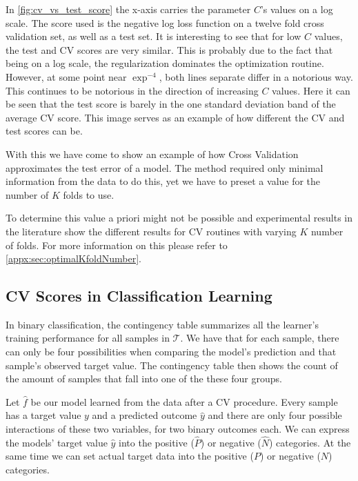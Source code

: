 In \cref{fig:cv_vs_test_score} the x-axis carries the parameter $C$'s values on a log scale.
The score used is the negative log loss function on a twelve fold cross validation set, as well as a test set.
It is interesting to see that for low $C$ values, the test and CV scores are very similar.
This is probably due to the fact that being on a log scale, the regularization dominates the optimization routine.
However, at some point near $\exp^{-4}$, both lines separate differ in a notorious way.
This continues to be notorious in the direction of increasing $C$ values.
Here it can be seen that the test score is barely in the one standard deviation band of the average CV score.
This image serves as an example of how different the CV and test scores can be.


With this we have come to show an example of how Cross Validation approximates the test error of a model.
The method required only minimal information from the data to do this, yet we have to preset a value for the number of $K$ folds to use.

To determine this value a priori might not be possible and experimental results in the literature show the different results for CV routines with varying $K$ number of folds.
For more information on this please refer to \cref{appx:sec:optimalKfoldNumber}.


\subsection{CV Scores in Classification Learning}\label{section:scoring_functions}

In binary classification, the contingency table summarizes all the learner's training performance for all samples in $\mathcal{T}$.
We have that for each sample, there can only be four possibilities when comparing the model's prediction and that sample's observed target value.
The contingency table then shows the count of the amount of samples that fall into one of the these four groups.

Let $\hat{f}$ be our model learned from the data after a CV procedure.
Every sample has a target value $y$ and a predicted outcome $\hat{y}$ and there are only four possible interactions of these two variables, for two binary outcomes each.
We can express the models' target value $\hat{y}$ into the positive ($\hat{P}$) or negative ($\hat{N}$) categories.
At the same time we can set actual target data into the positive ($P$) or negative ($N$) categories.

